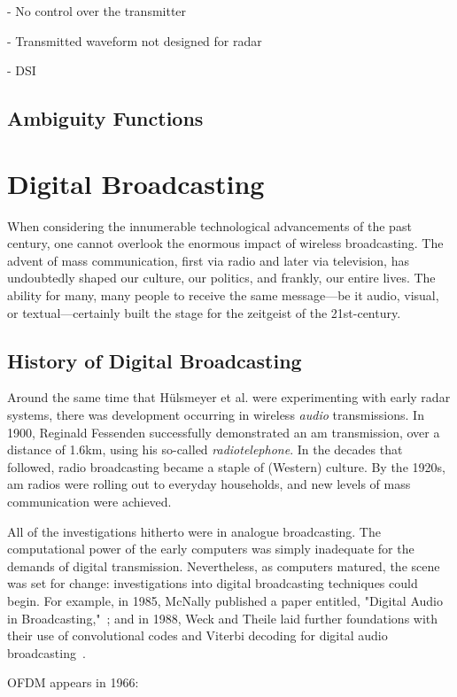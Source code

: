 \documentclass[class=report,11pt,crop=false]{standalone}
\begin{document}
- No control over the transmitter

- Transmitted waveform not designed for radar

- DSI

\subsection{Ambiguity Functions}

\section{Digital Broadcasting}
When considering the innumerable technological advancements of the past century, one cannot overlook the enormous impact of wireless broadcasting. The advent of mass communication, first via radio and later via television, has undoubtedly shaped our culture, our politics, and frankly, our entire lives. The ability for many, many people to receive the same message---be it audio, visual, or textual---certainly built the stage for the zeitgeist of the 21st-century.

\subsection{History of Digital Broadcasting}
Around the same time that H\"ulsmeyer et al. were experimenting with early radar systems, there was development occurring in wireless \emph{audio} transmissions. In 1900, Reginald Fessenden successfully demonstrated an \gls{am} transmission, over a distance of 1.6km, using his so-called \emph{radiotelephone}. In the decades that followed, radio broadcasting became a staple of (Western) culture. By the 1920s, \gls{am} radios were rolling out to everyday households, and new levels of mass communication were achieved.

All of the investigations hitherto were in analogue broadcasting. The computational power of the early computers was simply inadequate for the demands of digital transmission. Nevertheless, as computers matured, the scene was set for change: investigations into digital broadcasting techniques could begin. For example, in 1985, McNally published a paper entitled, "Digital Audio in Broadcasting,"~\cite{McNally1985}; and in 1988, Weck and Theile laid further foundations with their use of convolutional codes and Viterbi decoding for digital audio broadcasting~\cite{weck1988dab}.

OFDM appears in 1966: \cite{Chang1966}
\end{document}
